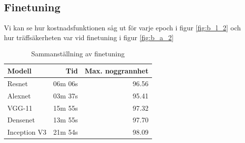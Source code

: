 \documentclass[]{kththesis}
\begin{document}
\subsection{Finetuning}
Vi kan se hur kostnadsfunktionen såg ut för varje epoch i figur \ref{fig:b_l_2} och hur träffsäkerheten var vid finetuning i figur \ref{fig:b_a_2}

\begin{table}
  \centering
  \begin{tabular}{|l|r|r|}
    Modell & Tid & Max. noggrannhet \\ 
    \hline
    Resnet       & 06m 06s & 96.56 \\
    Alexnet      & 03m 37s & 95.41 \\
    VGG-11       & 15m 55s & 97.32 \\
    Densenet     & 13m 55s & 97.70 \\
    Inception V3 & 21m 54s & 98.09 \\
  \end{tabular}
  \caption{Sammanställning av finetuning}
\end{table}
\end{document}
